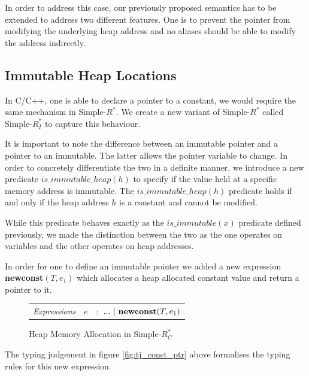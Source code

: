 \documentclass[a4paper,12pt]{report}
\begin{document}
\par
In order to address this case, our previously proposed semantics has to be 
extended to address two different features. One is to prevent the pointer from 
modifying the underlying heap address and no aliases should be able to modify 
the address indirectly.

\subsection{Immutable Heap Locations}
In C/C++, one is able to declare a pointer to a constant, we would require 
the same mechanism in Simple-$R^{*}$. We create a new variant of Simple-$R^{*}$ 
called Simple-$R^{*}_{I}$ to capture this behaviour. 

\par
It is important to note the 
difference between an immutable pointer and a pointer 
to an immutable. The latter allows the pointer variable to change. In order to 
concretely differentiate the two in a definite manner, we introduce 
a new predicate $is\_immutable\_heap(h)$ to specify if the value held at a 
specific memory address is immutable. The $is\_immutable\_heap(h)$ predicate 
holds if and only if the heap address $h$ is a constant and cannot be modified. 

\par
While this predicate behaves exactly as the $is\_immutable(x)$ predicate defined 
previously, we made the distinction between the two as the one operates on variables 
and the other operates on heap addresses. 

\par
In order for one to define an immutable pointer we added a new expression 
\textbf{newconst}$(T, e_1)$ which allocates a heap allocated constant value and 
return a pointer to it. 

\begin{figure}[H]
  \begin{center}
    \begin{tabular} {l l l}      
      \textit{Expressions} & $e$& $:$ $...\text{ }|\text{ \textbf{newconst}}(T, e_1)$ \\
    \end{tabular}
  \end{center}
  \caption{Heap Memory Allocation in Simple-$R^{*}_{C}$}
\end{figure}

\par
The typing judgement in figure \ref{fig:tj_const_ptr} above formalises the 
typing rules for this new expression. 
\end{document}
